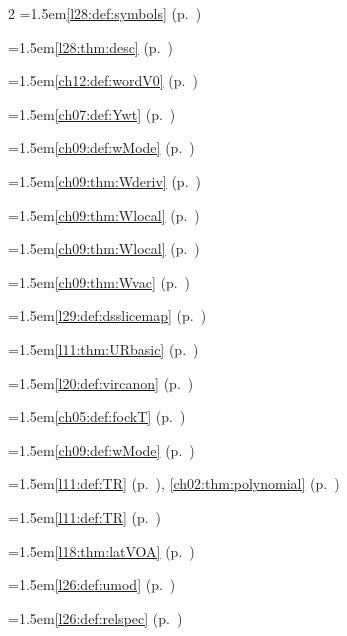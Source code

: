 \begin{multicols}{2}
\hangindent=1.5em\quad \ref{l28:def:symbols} (p.~\pageref{l28:def:symbols})\par
\hangindent=1.5em\quad \ref{l28:thm:desc} (p.~\pageref{l28:thm:desc})\par
\hangindent=1.5em\quad \ref{ch12:def:wordV0} (p.~\pageref{ch12:def:wordV0})\par
\hangindent=1.5em\quad \ref{ch07:def:Ywt} (p.~\pageref{ch07:def:Ywt})\par
\hangindent=1.5em\quad \ref{ch09:def:wMode} (p.~\pageref{ch09:def:wMode})\par
\hangindent=1.5em\quad \ref{ch09:thm:Wderiv} (p.~\pageref{ch09:thm:Wderiv})\par
\hangindent=1.5em\quad \ref{ch09:thm:Wlocal} (p.~\pageref{ch09:thm:Wlocal})\par
\hangindent=1.5em\quad \ref{ch09:thm:Wlocal} (p.~\pageref{ch09:thm:Wlocal})\par
\hangindent=1.5em\quad \ref{ch09:thm:Wvac} (p.~\pageref{ch09:thm:Wvac})\par
\hangindent=1.5em\quad \ref{l29:def:dsslicemap} (p.~\pageref{l29:def:dsslicemap})\par
\hangindent=1.5em\quad \ref{l11:thm:URbasic} (p.~\pageref{l11:thm:URbasic})\par
\hangindent=1.5em\quad \ref{l20:def:vircanon} (p.~\pageref{l20:def:vircanon})\par
\hangindent=1.5em\quad \ref{ch05:def:fockT} (p.~\pageref{ch05:def:fockT})\par
\hangindent=1.5em\quad \ref{ch09:def:wMode} (p.~\pageref{ch09:def:wMode})\par
\hangindent=1.5em\quad \ref{l11:def:TR} (p.~\pageref{l11:def:TR}), \ref{ch02:thm:polynomial} (p.~\pageref{ch02:thm:polynomial})\par
\hangindent=1.5em\quad \ref{l11:def:TR} (p.~\pageref{l11:def:TR})\par
\hangindent=1.5em\quad \ref{l18:thm:latVOA} (p.~\pageref{l18:thm:latVOA})\par
\hangindent=1.5em\quad \ref{l26:def:umod} (p.~\pageref{l26:def:umod})\par
\hangindent=1.5em\quad \ref{l26:def:relspec} (p.~\pageref{l26:def:relspec})\par
\par{}\par\nopagebreak\smallskip

\end{multicols}
